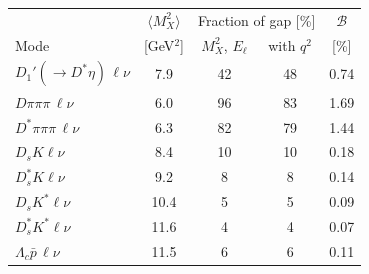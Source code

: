 \begin{tabular}{l c c c c}
\toprule
 & $\langle M_X^2\rangle$ & \multicolumn{2}{c}{Fraction of gap [\%]} & $\mathcal{B}$ \\
Mode & [GeV$^2$] & $M_X^2$, $E_\ell$ & with $q^2$ & [\%] \\
\midrule
$D_1'(\to D^*\eta)\,\ell\nu$ & 7.9 & 42 & 48 & 0.74 \\
$D\pi\pi\pi\,\ell\nu$ & 6.0 & 96 & 83 & 1.69 \\
$D^*\pi\pi\pi\,\ell\nu$ & 6.3 & 82 & 79 & 1.44 \\
$D_sK\ell\nu$ & 8.4 & 10 & 10 & 0.18 \\
$D_s^*K\ell\nu$ & 9.2 & 8 & 8 & 0.14 \\
$D_sK^*\ell\nu$ & 10.4 & 5 & 5 & 0.09 \\
$D_s^*K^*\ell\nu$ & 11.6 & 4 & 4 & 0.07 \\
$\Lambda_c\bar p\,\ell\nu$ & 11.5 & 6 & 6 & 0.11 \\
\bottomrule
\end{tabular}
